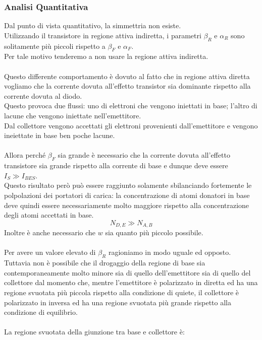 \documentclass[../main.tex]{subfiles}
\begin{document}
	\subsubsection{Analisi Quantitativa}
	Dal punto di vista quantitativo, la simmettria non esiste. \\
	Utilizzando il transistore in regione attiva indiretta, i parametri $\beta_R$ e $\alpha_R$ sono solitamente più piccoli rispetto a $\beta_F$ e $\alpha_F$. \\
	Per tale motivo tenderemo a non usare la regione attiva indiretta.\\\\
	Questo differente comportamento è dovuto al fatto che in regione attiva diretta vogliamo che la corrente dovuta all’effetto transistor sia dominante rispetto alla corrente dovuta al diodo. \\
	Questo provoca due flussi: uno di elettroni che vengono iniettati in base; l’altro di lacune che vengono iniettate nell’emettitore. \\
	Dal collettore vengono accettati gli elettroni provenienti dall’emettitore e vengono ineiettate in base ben poche lacune.\\\\
	Allora perché $\beta_F$ sia grande è necessario che la corrente dovuta all’effetto transistore sia grande rispetto alla corrente di base e dunque deve essere $I_S \gg I_{BES}$. \\
	Questo risultato però può essere raggiunto solamente sbilanciando fortemente le polpolazioni dei portatori di carica: la concentrazione di atomi donatori in base deve quindi essere necessariamente molto maggiore rispetto alla concentrazione degli atomi accettati in base.
	$$N_{D,E} \gg N_{A,B}$$
	Inoltre è anche necessario che $w$ sia quanto più piccolo possibile.\\\\
	Per avere un valore elevato di $\beta_R$ ragioniamo in modo uguale ed opposto. \\
	Tuttavia non è possibile che il drogaggio della regione di base sia contemporaneamente molto minore sia di quello dell’emettitore sia di quello del collettore dal momento che, mentre l’emettitore è polarizzato in diretta ed ha una regione svuotata più piccola rispetto alla condizione di quiete, il collettore è polarizzato in inversa ed ha una regione svuotata più grande rispetto alla condizione di equilibrio.\\\\
	La regione svuotata della giunzione tra base e collettore è:
\end{document}
